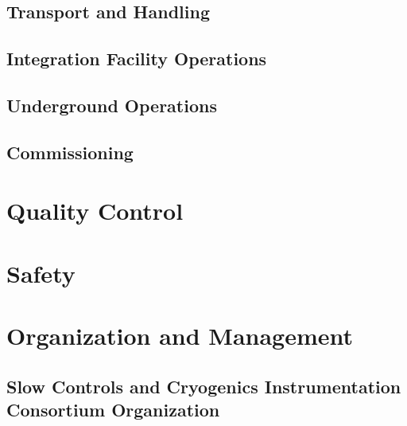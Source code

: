 \subsection{Transport and Handling}
\label{sec:fdsp-slow-cryo-install-transport}


\subsection{Integration Facility Operations}
\label{sec:fdsp-slow-cryo-install-facil-ops}


\subsection{Underground Operations}
\label{sec:fdsp-slow-cryo-install-undergr}

\subsection{Commissioning}
\label{sec:fdsp-slow-cryo-install-commiss}



\section{Quality Control}
\label{sec:fdsp-slow-cryo-qc}




\section{Safety}
\label{sec:fdsp-slow-cryo-safety}



\section{Organization and Management}
\label{sec:fdsp-slow-cryo-org}


\subsection{Slow Controls and Cryogenics Instrumentation Consortium Organization}
\label{sec:fdsp-slow-cryo-org-consortium}


